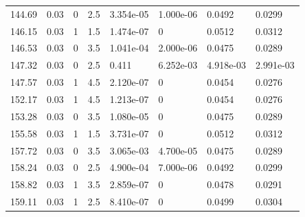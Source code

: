 \documentclass[preview]{standalone}
\begin{document}
{{{\begin{tabular}{L{1.2cm}C{1.2cm} C{0.3cm}C{0.5cm} C{1.4cm}C{1.4cm} C{1.4cm}C{1.4cm}}
  144.69  &  0.03  & 0     & 2.5 &  3.354e-05  & 1.000e-06  & 0.0492 &  0.0299   \\ 
  146.15  &  0.03  & 1     & 1.5 &  1.474e-07  & 0  & 0.0512 &  0.0312   \\ 
  146.53  &  0.03  & 0     & 3.5 &  1.041e-04  & 2.000e-06  & 0.0475 &  0.0289   \\ 
  147.32  &  0.03  & 0     & 2.5 &  0.411  & 6.252e-03  & 4.918e-03 &  2.991e-03   \\ 
  147.57  &  0.03  & 1     & 4.5 &  2.120e-07  & 0  & 0.0454 &  0.0276   \\ 
  152.17  &  0.03  & 1     & 4.5 &  1.213e-07  & 0  & 0.0454 &  0.0276   \\ 
  153.28  &  0.03  & 0     & 3.5 &  1.080e-05  & 0  & 0.0475 &  0.0289   \\ 
  155.58  &  0.03  & 1     & 1.5 &  3.731e-07  & 0  & 0.0512 &  0.0312   \\ 
  157.72  &  0.03  & 0     & 3.5 &  3.065e-03  & 4.700e-05  & 0.0475 &  0.0289   \\ 
  158.24  &  0.03  & 0     & 2.5 &  4.900e-04  & 7.000e-06  & 0.0492 &  0.0299   \\ 
  158.82  &  0.03  & 1     & 3.5 &  2.859e-07  & 0  & 0.0478 &  0.0291   \\ 
  159.11  &  0.03  & 1     & 2.5 &  8.410e-07  & 0  & 0.0499 &  0.0304   \\ 
\hline 
\end{tabular} 

}}}
\end{document}
